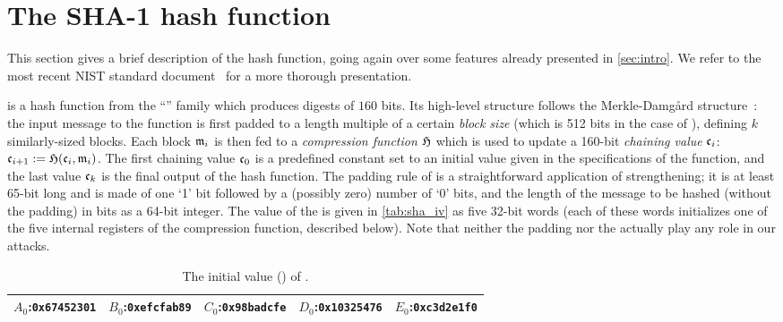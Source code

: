 \section{The SHA-1 hash function}
\label{sec:description}

This section gives a brief description of the \shaone hash function, going again over some features already presented in \autoref{sec:intro}. We refer to the most recent NIST standard document~\cite{Nist-SHA} for a more thorough
presentation.

\shaone is a hash function from the ``\mdsha'' family which produces digests of $160$ bits.
Its high-level structure follows the Merkle-Damg{\aa}rd structure~\cite{DBLP:conf/crypto/Merkle89a,DBLP:conf/crypto/Damgard89a}: the input message to the function
is first padded to a length multiple of a certain \emph{block size} (which is 512 bits in the case of \shaone), defining $k$ similarly-sized blocks.
Each block $\mathfrak{m}_i$ is then fed to a \emph{compression function} $\operatorname{\mathfrak{H}}$ which is used to update a 160-bit \emph{chaining value} $\mathfrak{c}_i$:
$\mathfrak{c}_{i+1} := \operatorname{\mathfrak{H}}(\mathfrak{c}_i,\mathfrak{m}_{i})$.
The first chaining value $\mathfrak{c}_0$ is a predefined constant set to an initial value \iv given in the specifications of the function, and the last value $\mathfrak{c}_k$ is the final output of the hash function.
The padding rule of \shaone is a straightforward application of \merkdam strengthening; it is at least 65-bit long and is made of one `1' bit followed by a (possibly zero)
number of `0' bits, and the length of the message to be hashed (without the padding) in bits as a 64-bit integer. The value of the \iv is given in \autoref{tab:sha_iv} as five 32-bit words
(each of these words initializes one of the five internal registers of the compression function, described below).
Note that neither the padding nor the \iv actually play any role in our attacks.

\begin{table}[ht]
\caption{\label{tab:sha_iv}The initial value (\iv) of \shaone.}
\begin{center}
\begin{tabular}{c c c c c} \toprule
$A_0$:\texttt{0x67452301} & $B_0$:\texttt{0xefcfab89} & $C_0$:\texttt{0x98badcfe} & $D_0$:\texttt{0x10325476} & $E_0$:\texttt{0xc3d2e1f0} \\ 
\bottomrule
\end{tabular}
\end{center}
\end{table}

